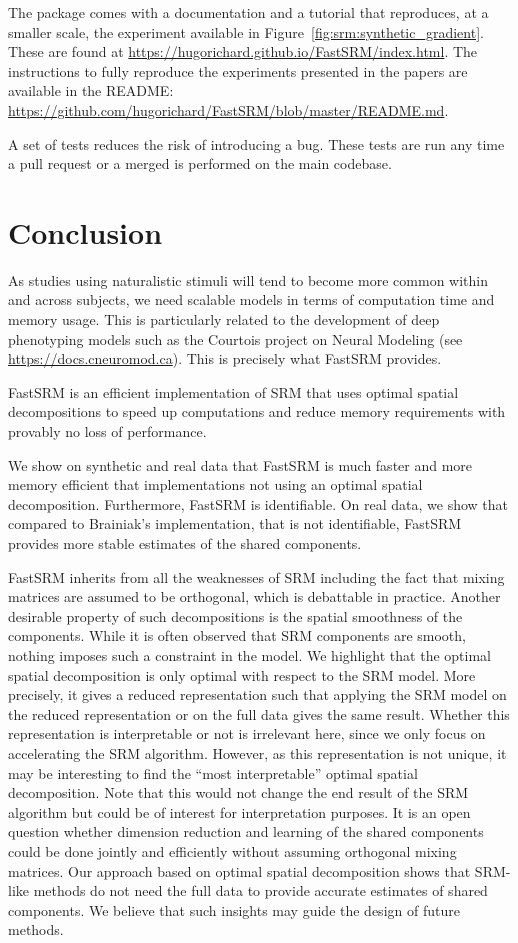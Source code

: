 \documentclass{article}
\begin{document}
The package comes with a documentation and a tutorial that reproduces, at a
smaller scale, the experiment available in Figure~\ref{fig:srm:synthetic_gradient}.
These are found at \url{https://hugorichard.github.io/FastSRM/index.html}.
The instructions to fully reproduce the experiments presented in the papers are
available in the README:
\url{https://github.com/hugorichard/FastSRM/blob/master/README.md}.

A set of tests reduces the risk of introducing a bug. These tests are run any
time a pull request or a merged is performed on the main codebase.

\section{Conclusion}
As studies using naturalistic stimuli will tend to become more common
within and across subjects, we need scalable models in terms of computation time
and memory usage.
%
This is particularly related to the development of deep phenotyping
models such as the Courtois project on Neural Modeling (see \url{https://docs.cneuromod.ca}).
%
This is precisely what FastSRM provides.

FastSRM is an efficient implementation of SRM
that uses optimal spatial decompositions to speed up computations and reduce memory requirements
with provably no loss of performance.

We show on synthetic and real data that FastSRM is much faster and more memory
efficient that implementations not using an optimal spatial decomposition.
Furthermore, FastSRM is identifiable. On real data, we show that compared to
Brainiak's implementation, that is not identifiable, FastSRM provides more
stable estimates of the shared components.

FastSRM inherits from all the weaknesses of SRM including the fact that
mixing matrices are assumed to be orthogonal, which is debattable in practice.
Another desirable property of such decompositions is the spatial smoothness of the components. While it is often observed that SRM components are smooth, nothing imposes such a constraint in the model.
%
We highlight that the optimal spatial decomposition is only optimal with respect to the SRM model.
%
More precisely, it gives a reduced representation such that applying the SRM model on the reduced representation or on the full data gives the same result.
%
Whether this representation is interpretable or not is irrelevant here, since we only focus on accelerating the SRM algorithm.
%
However, as this representation is not unique, it may be interesting to find the “most interpretable” optimal spatial decomposition. Note that this would not change the end result of the SRM algorithm but could be of interest for interpretation purposes.
%
It is an open question whether dimension reduction and learning of the shared
components could be done jointly and efficiently without assuming orthogonal
mixing matrices.
%
Our approach based on optimal spatial decomposition shows that SRM-like methods do not need the
full data to provide accurate estimates of shared components. We believe that such
insights may guide the design of future methods.
\end{document}
